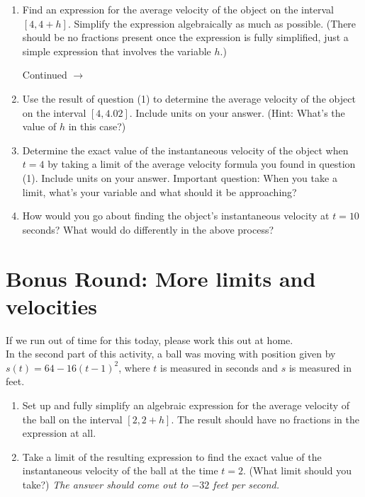 \documentclass[11pt]{article}
\def\ra{\rightarrow}
\def\pageturn{\vfill 
\begin{flushright}
	\begin{small}
		Continued $\ra$
	\end{small}
\end{flushright} \newpage}
\begin{document}
\begin{enumerate}
	\item Find an expression for the average velocity of the object on the interval $[4, 4+h]$. Simplify the expression algebraically as much as possible. (There should be no fractions present once the expression is fully simplified, just a simple expression that involves the variable $h$.)

\pageturn
	
	\item Use the result of question (1) to determine the average velocity of the object on the interval $[4, 4.02]$. Include units on your answer. (Hint: What's the value of $h$ in this case?) 
	
\vspace{1in}
	
	\item Determine the exact value of the instantaneous velocity of the object when $t=4$ by taking a limit of the average velocity formula you found in question (1). Include units on your answer. Important question: When you take a limit, what's your variable and what should it be approaching? 
	
\vspace{1.5in}	
	
	\item How would you go about finding the object's instantaneous velocity at $t = 10$ seconds? What would do differently in the above process? 

	
\end{enumerate}

\section{Bonus Round: More limits and velocities}
If we run out of time for this today, please work this out at home. \\


In the second part of this activity, a ball was moving with position given by $s(t) = 64 - 16(t-1)^2$, where $t$ is measured in seconds and $s$ is measured in feet. 
\begin{enumerate}
	\item Set up and fully simplify an algebraic expression for the average velocity of the ball on the interval $[2, 2+h]$. The result should have no fractions in the expression at all.
	\item Take a limit of the resulting expression to find the exact value of the instantaneous velocity of the ball at the time $t = 2$. (What limit should you take?) \emph{The answer should come out to $-32$ feet per second. }
\end{enumerate}
\end{document}
